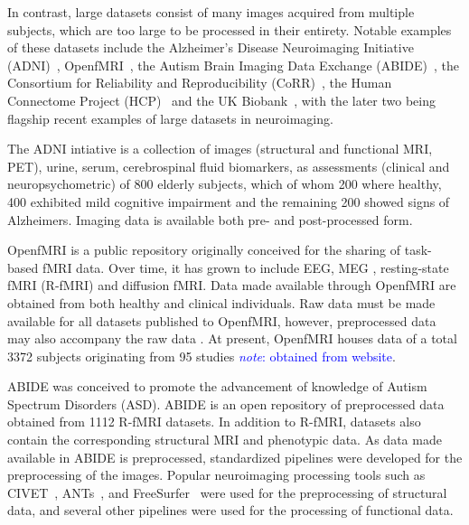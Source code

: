 \documentclass{report}
\newcommand{\note}[1]{\textcolor{blue}{\textit{note}: #1}}
\begin{document}
            In contrast, large datasets consist of many images acquired from
            multiple subjects, which are too large to be processed in their
            entirety. Notable examples of these datasets include the 
            Alzheimer's Disease Neuroimaging Initiative 
            (ADNI)~\cite{doi:10.1002/jmri.21049}, 
            OpenfMRI~\cite{POLDRACK2017259}, 
            the Autism Brain Imaging Data Exchange 
            (ABIDE)~\cite{Di-Martino:2013aa}, the Consortium for
            Reliability and Reproducibility (CoRR)~\cite{Zuo:2014aa}, the Human 
            Connectome Project (HCP)~\cite{VANESSEN201362} and the UK 
            Biobank~\cite{Miller:2016aa}, with the later
            two being flagship recent examples of large datasets in 
            neuroimaging.

            The ADNI intiative is a collection of images (structural and 
            functional MRI, PET), urine,
            serum, cerebrospinal fluid biomarkers, as assessments (clinical and
            neuropsychometric) of 800 elderly subjects, which of whom 200 where
            healthy, 400 exhibited mild cognitive impairment and the remaining
            200 showed signs of Alzheimers. Imaging data is available both 
            pre- and post-processed form.

            OpenfMRI is a public repository originally conceived for the sharing
            of task-based fMRI data. Over time, it has grown to include EEG, MEG
            , resting-state fMRI (R-fMRI) and diffusion fMRI. Data made 
            available through
            OpenfMRI are obtained from both healthy and clinical individuals.
            Raw data must be made available for all datasets published to 
            OpenfMRI, however, preprocessed data may also accompany the raw data
            . At present, OpenfMRI houses data of a total 3372 subjects
            originating from 95 studies \note{obtained from website}.

            ABIDE was conceived to promote the advancement of knowledge 
            of Autism Spectrum Disorders (ASD). %
            ABIDE is an open repository of 
            preprocessed data obtained from 1112 R-fMRI datasets.
            In addition to R-fMRI, datasets also contain the corresponding 
            structural MRI and phenotypic data. As data made available in ABIDE
            is preprocessed, standardized pipelines were developed for the 
            preprocessing of the images. Popular neuroimaging processing tools
            such as CIVET~\cite{citation-0}, ANTs~\cite{avants2009advanced}, 
            and FreeSurfer~\cite{FISCHL2012774} were used for the 
            preprocessing of structural data, and several other pipelines were
            used for the processing of functional data.
\end{document}
